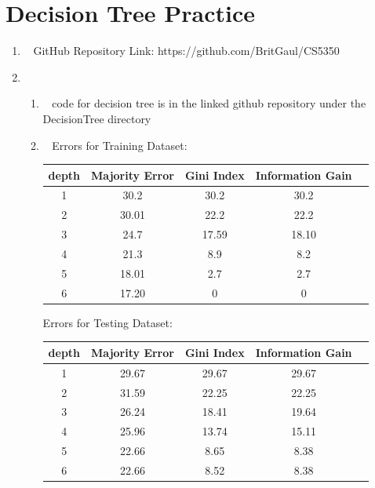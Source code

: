 \documentclass[12pt, fullpage,letterpaper]{article}
\begin{document}
\section{Decision Tree Practice}
\begin{enumerate}
	\item~
	\newline GitHub Repository Link: https://github.com/BritGaul/CS5350

\item~
\begin{enumerate}
\item~ 
\newline code for decision tree is in the linked github repository under the DecisionTree directory
\item~
\newline Errors for Training Dataset:
\begin{table}[h]
	\centering
	\begin{tabular}{cccc|c}
		depth & Majority Error & Gini Index & Information Gain\\ 
		\hline\hline
		1 & 30.2 & 30.2 & 30.2 \\ \hline
		2 & 30.01 & 22.2 & 22.2 \\ \hline
		3 & 24.7 & 17.59 & 18.10 \\ \hline
		4 & 21.3 & 8.9 & 8.2 \\ \hline
		5 & 18.01 & 2.7 & 2.7\\ \hline
		6 & 17.20 & 0 & 0\\ \hline
	\end{tabular}
\end{table}

 Errors for Testing Dataset:
\begin{table}[h]
	\centering
	\begin{tabular}{cccc|c}
		depth & Majority Error & Gini Index & Information Gain\\ 
		\hline\hline
		1 & 29.67 & 29.67 & 29.67 \\ \hline
		2 & 31.59 & 22.25 & 22.25\\ \hline
		3 & 26.24 & 18.41 & 19.64 \\ \hline
		4 & 25.96 & 13.74 & 15.11 \\ \hline
		5 & 22.66 & 8.65 & 8.38\\ \hline
		6 & 22.66 & 8.52 & 8.38\\ \hline
	\end{tabular}
\end{table}


\end{enumerate}
\end{enumerate}
\end{document}
